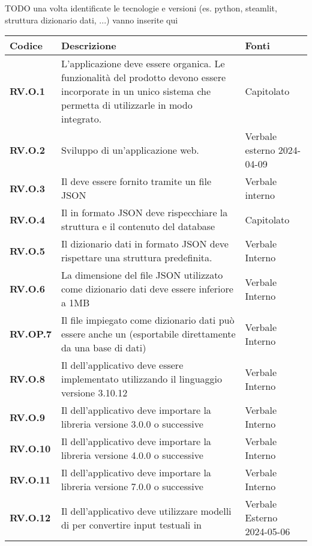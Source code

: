 TODO una volta identificate le tecnologie e versioni (es. python, steamlit, struttura dizionario dati, ...) vanno inserite qui
\begin{longtable}{|P{3cm}|P{6,5cm}|>{\arraybackslash}P{4cm}|}
  \hline
  \textbf{Codice} & \textbf{Descrizione} & \textbf{Fonti} \\
  \hline
  \textbf{RV.O.1} & L'applicazione deve essere organica. Le funzionalità del prodotto devono essere incorporate in un unico sistema che permetta di utilizzarle in modo integrato. & Capitolato \\
  \hline
  \textbf{RV.O.2} & Sviluppo di un'applicazione web. & Verbale esterno 2024-04-09 \\
  \hline
  \textbf{RV.O.3} & Il  deve essere fornito tramite un file JSON & Verbale interno \\
  \hline
  \textbf{RV.O.4} & Il  in formato JSON deve rispecchiare la struttura e il contenuto del database & Capitolato \\
  \hline
  \textbf{RV.O.5} & Il dizionario dati in formato JSON deve rispettare una struttura predefinita. & Verbale Interno \\
  \hline
  \textbf{RV.O.6} & La dimensione del file JSON utilizzato come dizionario dati deve essere inferiore a 1MB & Verbale Interno \\
  \hline
  \textbf{RV.OP.7} & Il file impiegato come dizionario dati può essere anche un  (esportabile direttamente da una base di dati) & Verbale Interno \\
  \hline
  \textbf{RV.O.8} & Il  dell'applicativo deve essere implementato utilizzando il linguaggio  versione 3.10.12 & Verbale Interno \\
  \hline
  \textbf{RV.O.9} & Il  dell'applicativo deve importare la libreria  versione 3.0.0 o successive & Verbale Interno \\
  \hline
  \textbf{RV.O.10} & Il  dell'applicativo deve importare la libreria  versione 4.0.0 o successive & Verbale Interno \\
  \hline
  \textbf{RV.O.11} & Il  dell'applicativo deve importare la libreria  versione 7.0.0 o successive & Verbale Interno \\
  \hline
  \textbf{RV.O.12} & Il  dell'applicativo deve utilizzare modelli di  per convertire input testuali in  & Verbale Esterno 2024-05-06 \\

\end{longtable}

